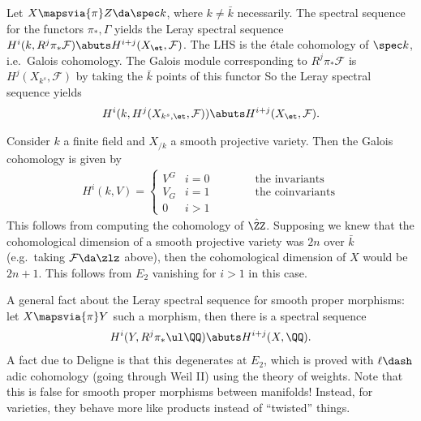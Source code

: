 \begin{example}[?]

Let \(X \mapsvia{\pi} Z \da \spec k\), where \(k\neq \bar k\)
necessarily. The spectral sequence for the functors \(\pi_*, \Gamma\)
yields the Leray spectral sequence
\(H^i(k, R^j \pi_* \mathcal{F}) \abuts H^{i+j}(X_\et, \mathcal{F})\).
The LHS is the étale cohomology of \(\spec k\), i.e.~Galois cohomology.
The Galois module corresponding to \(R^j \pi_* \mathcal{F}\) is
\(H^j(X_{k^{s}}, \mathcal{F})\) by taking the \(\bar k\) points of this
functor So the Leray spectral sequence yields
\begin{align*}  
H^i(k, H^j(X_{k^{s}, \et}, \mathcal{F} )) \abuts H^{i+j}(X_\et, \mathcal{F})
.\end{align*}

Consider \(k\) a finite field and \(X_{/k}\) a smooth projective
variety. Then the Galois cohomology is given by
\begin{align*}  
H^i(k, V) 
=
\begin{cases}
V^G & i = 0 \hspace{4em}\text{the invariants}\\
V_G & i = 1\hspace{4em}\text{the coinvariants} \\
0 & i>1
\end{cases}
\end{align*} This follows from computing the cohomology of \(\hat \ZZ\).
Supposing we knew that the cohomological dimension of a smooth
projective variety was \(2n\) over \(\bar k\) (e.g.~taking
\(\mathcal{F} \da \zlz\) above), then the cohomological dimension of
\(X\) would be \(2n+1\). This follows from \(E_2\) vanishing for \(i>1\)
in this case.

\end{example}

\begin{remark}

A general fact about the Leray spectral sequence for smooth proper
morphisms: let \(X \mapsvia{\pi} Y\) such a morphism, then there is a
spectral sequence
\begin{align*}  
H^i(Y, R^j \pi_* \ul \QQ) \abuts H^{i+j}(X, \QQ)
.\end{align*} A fact due to Deligne is that this degenerates at \(E_2\),
which is proved with \(\ell\dash\)adic cohomology (going through Weil
II) using the theory of weights. Note that this is false for smooth
proper morphisms between manifolds! Instead, for varieties, they behave
more like products instead of ``twisted'' things.

\end{remark}

